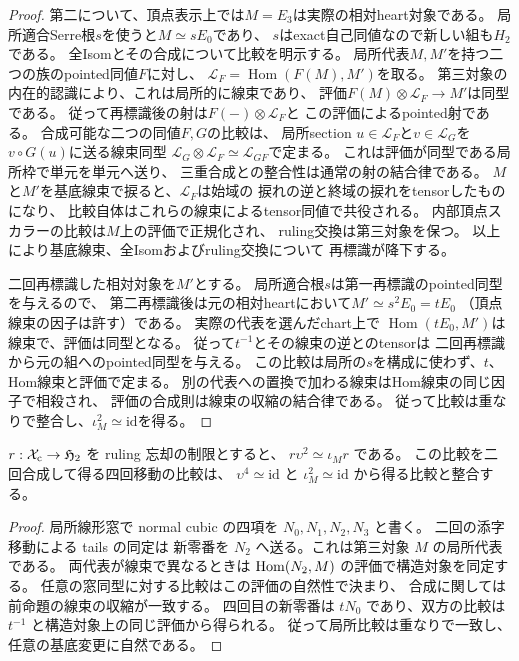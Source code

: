 \begin{proof}
第二について、頂点表示上では$M=E_3$は実際の相対heart対象である。
局所適合Serre根$s$を使うと$M\simeq sE_0$であり、
$s$はexact自己同値なので新しい組も$H_2$である。
全Isomとその合成について比較を明示する。
局所代表$M,M'$を持つ二つの族のpointed同値$F$に対し、
$\mathcal L_F=\operatorname{Hom}(F(M),M')$を取る。
第三対象の内在的認識により、これは局所的に線束であり、
評価$F(M)\otimes\mathcal L_F\to M'$は同型である。
従って再標識後の射は$F(-)\otimes\mathcal L_F$と
この評価によるpointed射である。
合成可能な二つの同値$F,G$の比較は、
局所section $u\in\mathcal L_F$と$v\in\mathcal L_G$を
$v\circ G(u)$に送る線束同型
$\mathcal L_G\otimes\mathcal L_F\simeq\mathcal L_{G F}$で定まる。
これは評価が同型である局所枠で単元を単元へ送り、
三重合成との整合性は通常の射の結合律である。
$M$と$M'$を基底線束で捩ると、$\mathcal L_F$は始域の
捩れの逆と終域の捩れをtensorしたものになり、
比較自体はこれらの線束によるtensor同値で共役される。
内部頂点スカラーの比較は$M$上の評価で正規化され、
ruling交換は第三対象を保つ。
以上により基底線束、全Isomおよびruling交換について
再標識が降下する。

二回再標識した相対対象を$M'$とする。
局所適合根$s$は第一再標識のpointed同型を与えるので、
第二再標識後は元の相対heartにおいて$M'\simeq s^2 E_0=tE_0$
（頂点線束の因子は許す）である。
実際の代表を選んだchart上で
$\operatorname{Hom}(tE_0,M')$は線束で、評価は同型となる。
従って$t^{-1}$とその線束の逆とのtensorは
二回再標識から元の組へのpointed同型を与える。
この比較は局所の$s$を構成に使わず、$t$、Hom線束と評価で定まる。
別の代表への置換で加わる線束はHom線束の同じ因子で相殺され、
評価の合成則は線束の収縮の結合律である。
従って比較は重なりで整合し、$\iota_M^2\simeq\mathrm{id}$を得る。
\end{proof}

\begin{corollary}
$r:\mathcal X_{\mathrm{c}}\to\mathfrak H_2$ を ruling 忘却の制限とすると、
$r\upsilon^2\simeq\iota_M r$ である。
この比較を二回合成して得る四回移動の比較は、
$\upsilon^4\simeq\mathrm{id}$ と $\iota_M^2\simeq\mathrm{id}$
から得る比較と整合する。
\end{corollary}
\begin{proof}
局所線形窓で normal cubic の四項を $N_0,N_1,N_2,N_3$ と書く。
二回の添字移動による tails の同定は
新零番を $N_2$ へ送る。これは第三対象 $M$ の局所代表である。
両代表が線束で異なるときは
$\operatorname{Hom}(N_2,M)$ の評価で構造対象を同定する。
任意の窓同型に対する比較はこの評価の自然性で決まり、
合成に関しては前命題の線束の収縮が一致する。
四回目の新零番は $tN_0$ であり、双方の比較は
$t^{-1}$ と構造対象上の同じ評価から得られる。
従って局所比較は重なりで一致し、任意の基底変更に自然である。
\end{proof}

